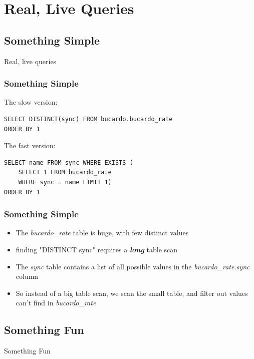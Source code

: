 \documentclass{beamer}
\begin{document}
\section{Real, Live Queries}
\subsection{Something Simple}
\begin{frame}
    \begin{center}
       Real, live queries
    \end{center}
\end{frame}

\begin{frame}[fragile]
    \frametitle{Something Simple}
    The slow version:
    \begin{verbatim}
SELECT DISTINCT(sync) FROM bucardo.bucardo_rate
ORDER BY 1
    \end{verbatim}
    The fast version:
    \begin{verbatim}
SELECT name FROM sync WHERE EXISTS (
    SELECT 1 FROM bucardo_rate
    WHERE sync = name LIMIT 1)
ORDER BY 1
    \end{verbatim}
\end{frame}

\begin{frame}
    \frametitle{Something Simple}
    \begin{itemize}
        \item The \emph{bucardo\_rate} table is huge, with few distinct values
        \item finding "DISTINCT sync" requires a \textbf{\emph{long}} table scan
        \item The \emph{sync} table contains a list of all possible values in the \emph{bucardo\_rate.sync} column
        \item So instead of a big table scan, we scan the small table, and filter out values can't find in \emph{bucardo\_rate}
    \end{itemize}
\end{frame}

\subsection{Something Fun}
\begin{frame}
    \begin{center}Something Fun\end{center}
\end{frame}
\end{document}

